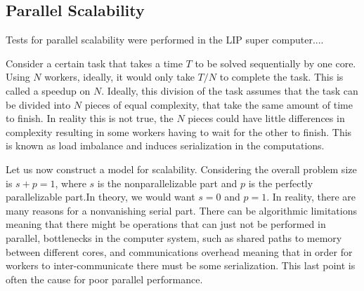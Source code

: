 \subsection{Parallel Scalability}

	Tests for parallel scalability were performed in the LIP super computer.... 
	
	Consider a certain task that takes a time $T$ to be solved sequentially by one core. Using $N$ workers, ideally, it would only take $T / N$ to complete the task. This is called a speedup on $N$. Ideally, this division of the task assumes that the task can be divided into $N$ pieces of equal complexity, that take the same amount of time to finish. In reality this is not true, the $N$ pieces could have little differences in complexity resulting in some workers having to wait for the other to finish. This is known as load imbalance and induces serialization in the computations.
	
	Let us now construct a model for scalability. Considering the overall problem size is $s + p = 1$, where $s$ is the nonparallelizable part and $p$ is the perfectly parallelizable part.In theory, we would want $s=0$ and $p=1$. In reality, there are many reasons for a nonvanishing serial part. There can be algorithmic limitations meaning that there might be operations that can just not be performed in parallel, bottlenecks in the computer system, such as shared paths to memory between different cores, and communications overhead meaning that in order for workers to inter-communicate there must be some serialization. This last point is often the cause for poor parallel performance. 
	
	\pagebreak
	
